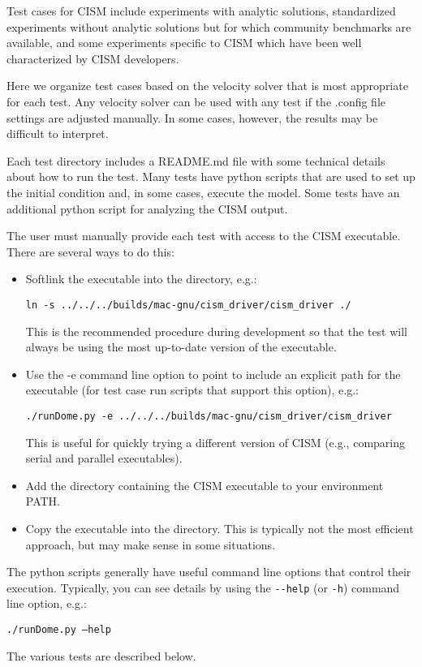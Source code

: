
\label{ch:tests}

Test cases for CISM include experiments with analytic solutions, standardized experiments
without analytic solutions but for which community benchmarks are available, and
some experiments specific to CISM which have been well characterized by CISM developers.

Here we organize test cases based on the velocity solver that is most appropriate
for each test.  Any velocity solver can be used with any test
if the .config file settings are adjusted manually.  In some cases, however, the results
may be difficult to interpret.

Each test directory includes a README.md file with some technical details 
about how to run the test.  Many tests have python scripts that are used to set up
the initial condition and, in some cases, execute the model.  Some tests
have an additional python script for analyzing the CISM output.

The user must manually provide each test with access to the CISM executable.
There are several ways to do this:

\begin{itemize}
  \item Softlink the executable into the directory, e.g.:

        \texttt{ln -s ../../../builds/mac-gnu/cism\_driver/cism\_driver ./}

        This is the recommended procedure during development so that the test
        will always be using the most up-to-date version of the executable.

  \item Use the -e command line option to point to include an explicit path for the executable (for test case run scripts that support this option), e.g.:

        \texttt{./runDome.py -e ../../../builds/mac-gnu/cism\_driver/cism\_driver}

        This is useful for quickly trying a different version of CISM (e.g., comparing 
        serial and parallel executables).

  \item Add the directory containing the CISM executable to your environment PATH.

  \item Copy the executable into the directory.  This is typically not the most efficient approach,
        but may make sense in some situations.
\end{itemize}

The python scripts generally have useful
command line options that control their execution.  Typically, you can see details 
by using the \texttt{-{}-help} (or \texttt{-h}) command line option, e.g.:

\texttt{./runDome.py --help}

The various tests are described below.





